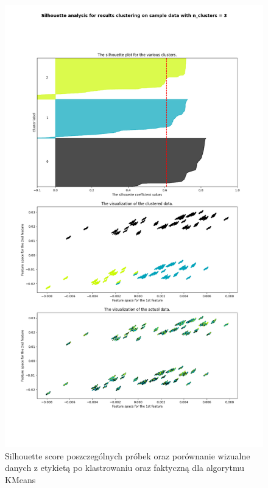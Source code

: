 \documentclass{classrep}
\begin{document}
{{{                 \begin{figure}[!htbp]
                    \centering
                    \includegraphics[width=1\textwidth]{img/clustering/kmeans_silh_crime_codes.png}
                    \caption{Silhouette score poszczególnych próbek oraz porównanie wizualne danych z etykietą po klastrowaniu oraz faktyczną dla algorytmu KMeans}
                    \label{silh_kmeans}
                \end{figure}
                \FloatBarrier
                
}}}
\end{document}
